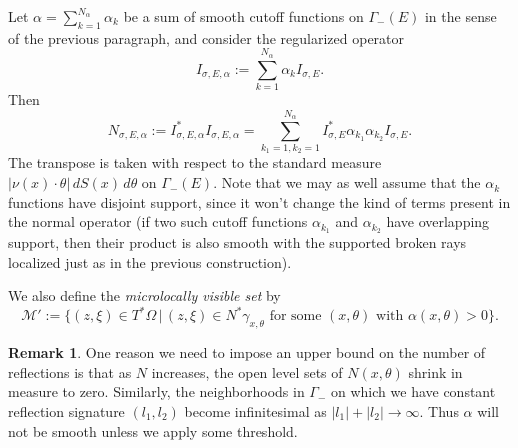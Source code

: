 \documentclass[10pt]{amsart}
\theoremstyle{definition}
\theoremstyle{definition}
\newtheorem{remark*}{Remark}
\theoremstyle{definition}
\begin{document}
Let $\alpha = \sum_{k=1}^{N_{\alpha}}\alpha_{k}$ be a sum of smooth cutoff functions on $\Gamma_{-}(E)$ in the sense of the previous paragraph, and consider the regularized operator
\begin{equation}
I_{\sigma,E,\alpha} := \sum_{k=1}^{N_{\alpha}}\alpha_{k} I_{\sigma,E}.
\end{equation}
Then
\begin{equation}
N_{\sigma, E, \alpha} := I_{\sigma, E,\alpha}^{*} I_{\sigma, E, \alpha} =  \sum_{k_{1}=1,k_{2}=1}^{N_{\alpha}}I_{\sigma,E}^{*}\alpha_{k_{1}}\alpha_{k_{2}}I_{\sigma, E}.
\end{equation}
The transpose is taken with respect to the standard measure $|\nu(x) \cdot \theta|\,dS(x)\,d\theta$ on $\Gamma_{-}(E)$. Note that we may as well assume that the $\alpha_{k}$ functions have disjoint support, since it won't change the kind of terms present in the normal operator (if two such cutoff functions $\alpha_{k_{1}}$ and $\alpha_{k_{2}}$ have overlapping support, then their product is also smooth with the supported broken rays localized just as in the previous construction).

We also define the \textit{microlocally visible set} by
\begin{equation}
\mathcal{M}' := \{ (z,\xi) \in T^{*}\Omega \, | \, (z,\xi) \in N^{*}\gamma_{x,\theta} \textrm{ for some }(x,\theta) \textrm{ with }\alpha(x,\theta) > 0\}.
\end{equation}

\begin{remark*}One reason we need to impose an upper bound on the number of reflections is that as $N$ increases, the open level sets of $N(x,\theta)$ shrink in measure to zero. Similarly, the neighborhoods in $\Gamma_{-}$ on which we have constant reflection signature $(l_{1},l_{2})$ become infinitesimal as $|l_{1}|+|l_{2}| \to \infty$. Thus $\alpha$ will not be smooth unless we apply some threshold.\end{remark*}
\end{document}

